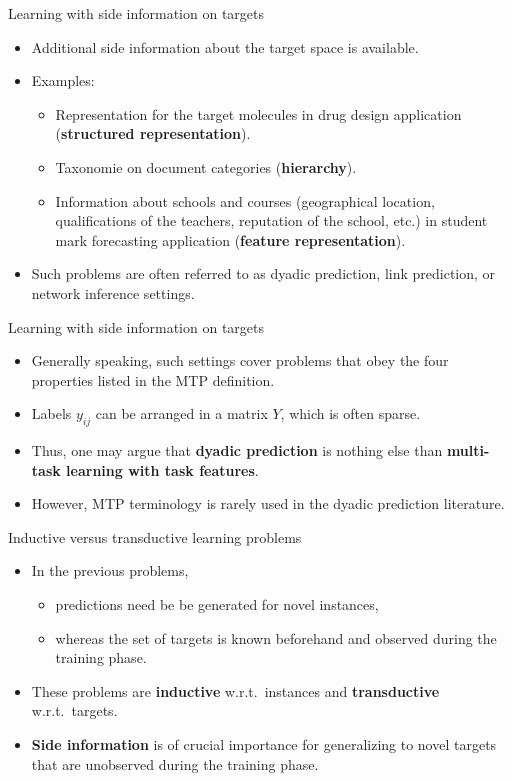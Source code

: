 \documentclass[]{beamer}
\renewcommand{\emph}[1]{\textbf{\color{putblue}#1}}
\begin{document}
\begin{frame}{Learning with side information on targets}
\begin{itemize}
\item Additional side information about the target space is available.
\item Examples: 
\begin{itemize}
\item Representation for the target molecules in drug design application (\emph{structured representation}).
\item Taxonomie on document categories (\emph{hierarchy}).
\item Information about schools and courses (geographical location, qualifications of the teachers, reputation of the school, etc.) in student mark forecasting application (\emph{feature representation}).
\end{itemize}
\item Such problems are often referred to as dyadic prediction, link prediction, or network inference settings.
\end{itemize}
\end{frame}


\begin{frame}{Learning with side information on targets}
\begin{itemize}
\item
Generally speaking, such settings cover problems that obey the four properties listed in the MTP definition. 
\item Labels $y_{ij}$ can be arranged in a matrix $Y$, which is often sparse. 
\item Thus, one may argue that \emph{dyadic prediction} is nothing else than \emph{multi-task learning with task features}. 
\item However, MTP terminology is rarely used in the dyadic prediction literature. 
\end{itemize}
\end{frame}





\begin{frame}{Inductive versus transductive learning problems}
\begin{itemize} 
\item In the previous problems, 
\begin{itemize}
\item predictions need be be generated for novel instances, 
\item whereas the set of targets is known beforehand and observed during the training phase.
\end{itemize}
\item These problems are \emph{inductive} w.r.t.\ instances and \emph{transductive} w.r.t.\ targets.
\item   
\emph{Side information} is of crucial importance for generalizing to novel targets that are unobserved during the training phase.
\end{itemize}
\end{frame}
\end{document}
